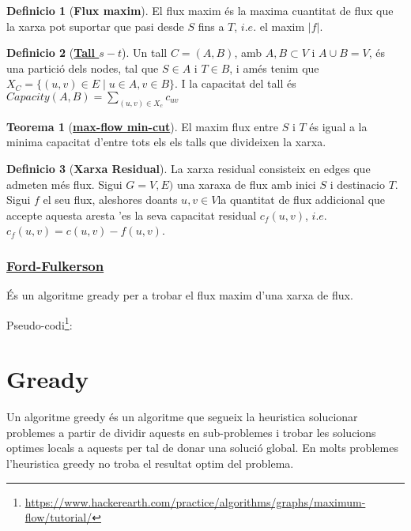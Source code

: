 \documentclass[12pt]{article}
\theoremstyle{definition}
\newtheorem{definicio}{Definicio}
\theoremstyle{definition}
\theoremstyle{definition}
\theoremstyle{definition}
\theoremstyle{definition}
\theoremstyle{definition}
\newtheorem{teo}{Teorema}
\theoremstyle{definition}
\begin{document}
\begin{definicio}[\textbf{Flux maxim}]
El flux maxim és la maxima cuantitat de flux que la xarxa pot suportar que pasi desde $S$ fins a $T$, $i.e.$ el maxim $|f|$.
\end{definicio}

\begin{definicio}[\href{https://en.wikipedia.org/wiki/Cut_(graph_theory)}{\color{blue}\textbf{Tall $s-t$}}]
Un tall $C=(A,B)$, amb $A,B\subset V$ i $A\cup B=V$, és una partició dels nodes, tal que $S\in A$ i $T\in B$, i amés tenim que $X_C=\{(u,v)\in E\mid u\in A,v\in B\}$.
I la capacitat del tall és $Capacity(A,B)=\sum_{(u,v)\in X_c} c_{uv}$
\end{definicio}

\begin{teo}[\href{https://en.wikipedia.org/wiki/Max-flow_min-cut_theorem}{\color{blue}\textbf{max-flow min-cut}}]
El maxim flux entre $S$ i $T$ és igual a la minima capacitat d'entre tots els els talls que divideixen la xarxa.  
\end{teo}

\begin{definicio}[\textbf{Xarxa Residual}]
La xarxa residual consisteix en edges que admeten més flux. Sigui $G=V,E)$ una xaraxa de flux amb inici $S$ i destinacio $T$. Sigui $f$ el seu flux, aleshores doants $u,v\in V$la quantitat de flux addicional que accepte aquesta aresta 'es la seva capacitat residual $c_f(u,v)$, $i.e.$ $c_f(u,v)=c(u,v)-f(u,v)$. 
\end{definicio}

\subsubsection{\href{https://en.wikipedia.org/wiki/Ford–Fulkerson_algorithm}{\color{blue}Ford-Fulkerson}}
És un algoritme gready per a trobar el flux maxim d'una xarxa de flux.

Pseudo-codi\footnote{\url{https://www.hackerearth.com/practice/algorithms/graphs/maximum-flow/tutorial/}}:


\section{Gready}
Un algoritme greedy és un algoritme que segueix la heuristica solucionar problemes a partir de dividir aquests en sub-problemes i trobar les solucions optimes locals a aquests per tal de donar una solució global. En molts problemes l'heuristica greedy no troba el resultat optim del problema.
\end{document}
